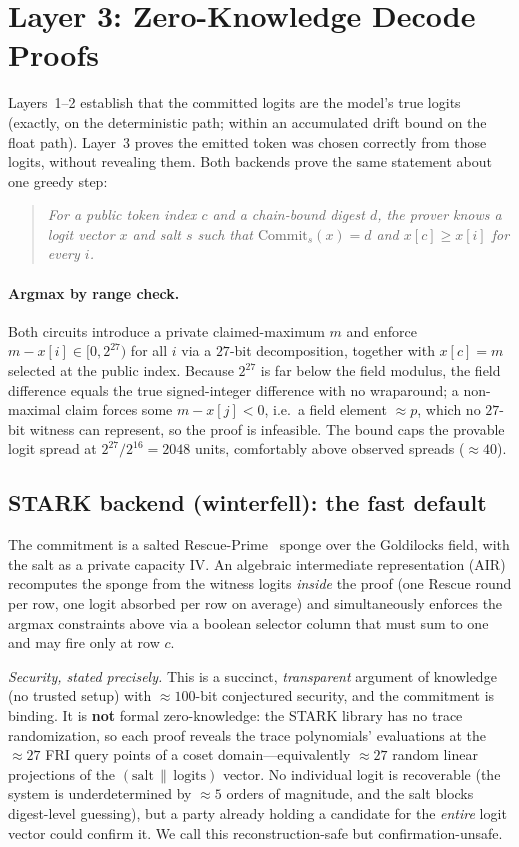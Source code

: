 \documentclass[11pt]{article}
\begin{document}
\section{Layer 3: Zero-Knowledge Decode Proofs}\label{sec:l3}

Layers~1--2 establish that the committed logits are the model's true logits
(exactly, on the deterministic path; within an accumulated drift bound on the
float path). Layer~3 proves the emitted token was chosen correctly from those
logits, without revealing them. Both backends prove the same statement about one
greedy step:
\begin{quote}\itshape
For a public token index $c$ and a chain-bound digest $d$, the prover knows a
logit vector $x$ and salt $s$ such that $\mathrm{Commit}_s(x) = d$ and
$x[c] \ge x[i]$ for every $i$.
\end{quote}

\paragraph{Argmax by range check.} Both circuits introduce a private
claimed-maximum $m$ and enforce $m - x[i] \in [0, 2^{27})$ for all $i$ via a
$27$-bit decomposition, together with $x[c] = m$ selected at the public index.
Because $2^{27}$ is far below the field modulus, the field difference equals the
true signed-integer difference with no wraparound; a non-maximal claim forces
some $m - x[j] < 0$, i.e.\ a field element ${\approx}\!p$, which no $27$-bit
witness can represent, so the proof is infeasible. The bound caps the provable
logit spread at $2^{27}/2^{16} = 2048$ units, comfortably above observed spreads
(${\approx}40$).

\subsection{STARK backend (winterfell): the fast default}
The commitment is a salted Rescue-Prime~\cite{rescue} sponge over the Goldilocks
field, with the salt as a private capacity IV. An algebraic intermediate
representation (AIR) recomputes the sponge from the witness logits \emph{inside}
the proof (one Rescue round per row, one logit absorbed per row on average) and
simultaneously enforces the argmax constraints above via a boolean selector
column that must sum to one and may fire only at row $c$.

\emph{Security, stated precisely.} This is a succinct, \emph{transparent}
argument of knowledge (no trusted setup) with ${\approx}100$-bit conjectured
security, and the commitment is binding. It is \textbf{not} formal
zero-knowledge: the STARK library has no trace randomization, so each proof
reveals the trace polynomials' evaluations at the ${\approx}27$ FRI query points
of a coset domain---equivalently ${\approx}27$ random linear projections of the
$(\text{salt}\,\|\,\text{logits})$ vector. No individual logit is recoverable
(the system is underdetermined by ${\approx}5$ orders of magnitude, and the salt
blocks digest-level guessing), but a party already holding a candidate for the
\emph{entire} logit vector could confirm it. We call this reconstruction-safe but
confirmation-unsafe.
\end{document}
